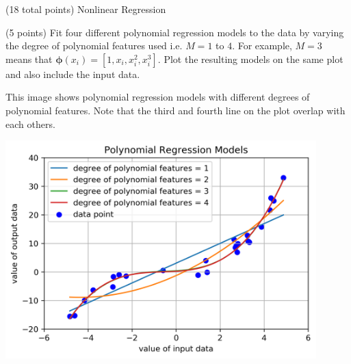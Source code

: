 \documentclass[12pt]{article}
\begin{document}
\clearpage



\begin{question}{(18 total points) Nonlinear Regression}





%
%
\begin{subquestion}{(5 points) Fit four different polynomial regression models to the data  by varying the degree of polynomial features used i.e. $M = 1$ to $4$.
For example, $M=3$ means that $\boldsymbol{\phi}(x_i) = [1, x_i, x_i^2, x_i^3]$.
Plot the resulting models on the same plot and also include the input data.\\
}


\begin{answerbox}{35em}
This image shows polynomial regression models with different degrees of polynomial features. Note that the third and fourth line on the plot overlap with each others.
\begin{center}
\includegraphics[width=0.9\textwidth]{Poly.png}
\end{center}
\end{answerbox}




\end{subquestion}
\end{question}
\end{document}
